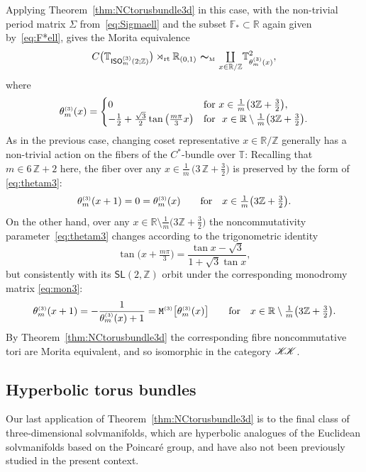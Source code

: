 \documentclass[pdftex]{sigma}
\numberwithin{equation}{section}
\newcommand{\Z}{\zed}
\newcommand{\F}{\mathbb{F}}
\newcommand{\mbf}[1]{{\boldsymbol {#1} }}
\newcommand{\CCK}{\mathscr{K}}
\newcommand{\sfSL}{\mathsf{SL}}
\newcommand{\ISO}{{\sf ISO}}
\newcommand{\rt}{{\rm rt}}
\newcommand{\mcoprod}{\mbox{$\coprod\limits_{x\in\R/\Z}$}}
\newcommand{\R}{\real}
\newcommand{\zed}{{\mathbb Z}} %
\newcommand{\real}{{\mathbb R}} %
\newcommand{\torus}{{\mathbb T}} %
\begin{document}
Applying Theorem~\ref{thm:NCtorusbundle3d} in this case, with the
non-trivial period matrix $\Sigma$ from~\eqref{eq:Sigmaell} and the
subset $\F_*\subset\R$ again given by~\eqref{eq:F*ell}, gives
 the Morita equivalence
\[
C\big(\torus_{\ISO^{\text{\tiny($3$)}}_m(2;\Z)}\big)\rtimes_\rt\real_{(0,1)}
\ \mbf\sim_{\text{\tiny M}} \ \mcoprod
\torus^2_{\theta^{\text{\tiny(3)}}_m(x)} ,
\]
where
\begin{gather}\label{eq:thetam3}
\theta_m^{\text{\tiny(3)}}(x) = \begin{cases}
 0 & \mbox{for} \ x \in
 \frac1{m} \big(3 \Z+\frac32\big) , \\
 -\frac12 + \frac{\sqrt3}2\tan\big(\frac{m \pi}3 x\big)
 & \mbox{for} \ \ x\in\R\setminus \frac1{m} \big(3 \Z+\frac32\big) . \end{cases}
\end{gather}
As in the previous case, changing coset representative
$x\in\R/\Z$ generally has a non-trivial action on the fibers of the
$C^*$-bundle over $\torus$: Recalling that $m\in 6\,\Z+2$ here, the
fiber over any $x\in\frac1m\,\big(3\,\Z+\frac32\big)$ is preserved by
the form of \eqref{eq:thetam3}:
\[
\theta_m^{\text{\tiny(3)}}(x+1) =
 0=\theta_m^{\text{\tiny(3)}}(x)
\qquad \mbox{for} \quad x\in\tfrac1m\big(3\Z +\tfrac32\big) .
\]
On the other hand, over any $x\in\R\setminus\frac1m\big(3\Z+\frac32\big)$
the noncommutativity parameter~\eqref{eq:thetam3} changes according to
the trigonometric identity
\[
\tan\big(x+\tfrac{m \pi}3\big) = \frac{\tan x-\sqrt3}{1+\sqrt3 \tan x} ,
\]
but consistently with its $\sfSL(2,\Z)$ orbit under the corresponding
monodromy matrix \eqref{eq:mon3}:
\[
\theta_m^{\text{\tiny(3)}}(x+1) =
-\frac1{\theta_m^{\text{\tiny(3)}}(x)+1} = {\tt
 M}^{\text{\tiny(3)}}\big[ \theta_m^{\text{\tiny(3)}}(x)\big] \qquad \mbox{for} \quad x\in\R\setminus\tfrac1m \big(3 \Z +\tfrac32\big).
\]
By Theorem~\ref{thm:NCtorusbundle3d} the corresponding fibre noncommutative tori are Morita
equivalent,
and so isomorphic in the category ${\CCK\hspace{-1mm}\CCK}$.

\subsection{Hyperbolic torus bundles}\label{sec:hyperbolicbundles}

Our last application of
Theorem~\ref{thm:NCtorusbundle3d} is to the final class of
three-dimensional solvmanifolds, which are
hyperbolic analogues of the Euclidean solvmanifolds based on the
Poincar\'e group, and have also not been
previously studied in the present context.
\end{document}
